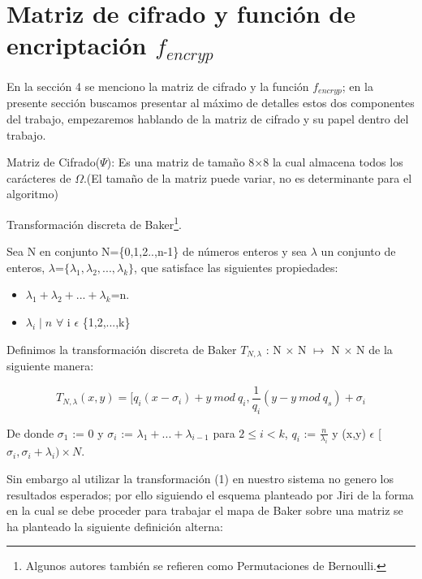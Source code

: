 \section{Matriz de cifrado y funci\'on de encriptaci\'on $f_{encryp}$}

En la secci\'on 4 se menciono la matriz de cifrado y la funci\'on $f_{encryp}$; en la presente secci\'on buscamos presentar al m\'aximo de detalles estos dos componentes del trabajo, empezaremos hablando de la matriz de cifrado y su papel dentro del trabajo.

\begin{defi} Matriz de Cifrado($\Psi$): 
	Es una matriz de tama\~no 8$\times$8 la cual almacena todos los car\'acteres de $\Omega$.(El tamaño de la matriz puede variar, no es determinante para el algoritmo)
\end{defi}

\begin{defi} Transformaci\'on discreta de Baker\footnote{Algunos autores tambi\'en se refieren como Permutaciones de Bernoulli.}.

Sea N en conjunto N=\{0,1,2..,n-1\} de n\'umeros enteros y sea $\lambda$ un conjunto de enteros, $\lambda$=$\{\lambda_{1}, \lambda_{2},...,\lambda_{k}\}$, que satisface las siguientes propiedades:

\begin{itemize}
	\item $\lambda_{1}+\lambda_{2}+...+\lambda_{k}$=n.
	\item $\lambda_{i}\mid n$ $\forall$ i $\epsilon$ \{1,2,...,k\}
\end{itemize}

Definimos la transformaci\'on discreta de Baker $T_{N,\lambda}$ : N $\times$ N $\longmapsto$ N $\times$ N de la siguiente manera:

\begin{equation}
  T_{N,\lambda}(x,y) = [q_{i}(x-\sigma_{i}) + y \ mod \ q_{i} , \frac{1}{q_{i}}(y - y \ mod \ q_{s} ) + \sigma_{i}
\end{equation}

De donde $\sigma_{1}$ := 0 y $\sigma_{i}$ := $\lambda_{1}+...+\lambda_{i-1}$ para $2 \leq i < k$, $q_{i}$ := $\frac{n}{\lambda_{i}}$ y (x,y) $\epsilon$ [$\sigma_{i},\sigma_{i}+\lambda_{i})\times N $.

\end{defi}

Sin embargo al utilizar la transformaci\'on (1) en nuestro sistema no genero los resultados esperados; por ello siguiendo el esquema planteado por Jiri \cite{Jiri} de la forma en la cual se debe proceder para trabajar el mapa de Baker sobre una matriz se ha planteado la siguiente definici\'on alterna:

